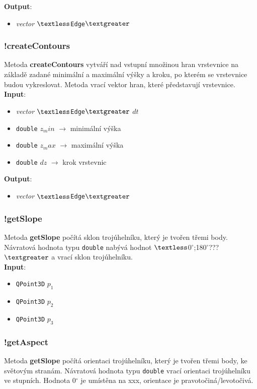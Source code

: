\documentclass[a4paper, 12pt]{article}
\begin{document}
\textbf{Output}:
\begin{itemize}
\item \textsl{vector} $\textless$\texttt{Edge}$\textgreater$
\end{itemize}

\subsubsection*{!createContours}
Metoda \textbf{createContours} vytváří nad vstupní množinou hran vrstevnice na základě zadané minimální a maximální výšky a kroku, po kterém se vrstevnice budou vykreslovat.  Metoda vrací vektor hran, které představují vrstevnice.\\

\textbf{Input}:
\begin{itemize}
\item \textsl{vector} $\textless$\texttt{Edge}$\textgreater$ $dt$
\item \texttt{double} $z_min$ $\rightarrow$ minimální výška
\item \texttt{double} $z_max$ $\rightarrow$ maximální výška
\item \texttt{double} $dz$ $\rightarrow$ krok vrstevnic
\end{itemize}

\textbf{Output}:
\begin{itemize}
\item \textsl{vector} $\textless$\texttt{Edge}$\textgreater$
\end{itemize}

\subsubsection*{!getSlope}
Metoda \textbf{getSlope} počítá sklon trojúhelníku, který je tvořen třemi body. Návratová hodnota typu \texttt{double} nabývá hodnot $\textless$0$^\circ$;180$^\circ$???$\textgreater$ a vrací sklon trojúhelníku.\\

\textbf{Input}:
\begin{itemize}
\item \texttt{QPoint3D} $p_1$
\item \texttt{QPoint3D} $p_2$
\item \texttt{QPoint3D} $p_3$
\end{itemize}

\subsubsection*{!getAspect}
Metoda \textbf{getSlope} počítá orientaci trojúhelníku, který je tvořen třemi body, ke světovým stranám. Návratová hodnota typu \texttt{double} vrací orientaci trojúhelníku ve stupních. Hodnota 0$^\circ$ je umístěna na xxx, orientace je pravotočiná/levotočivá.\\
\end{document}
